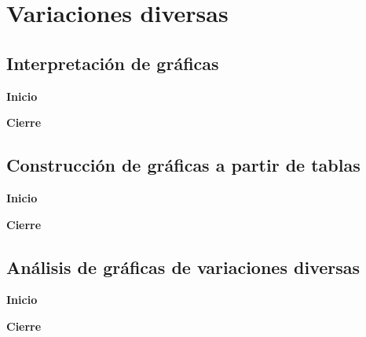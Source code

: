 \thispagestyle{plain}
\section{Variaciones diversas}


\subsection{Interpretación de gr\'aficas}

\begin{boxK}
    \begin{center}\textbf{Inicio}\end{center}

\end{boxK}

\begin{boxK}
    \begin{center}\textbf{Cierre}\end{center}

\end{boxK}

\subsection{Construcción de gr\'aficas a partir de tablas}

\begin{boxK}
    \begin{center}\textbf{Inicio}\end{center}

\end{boxK}

\begin{boxK}
    \begin{center}\textbf{Cierre}\end{center}

\end{boxK}

\subsection{Análisis de gr\'aficas de variaciones diversas}

\begin{boxK}
    \begin{center}\textbf{Inicio}\end{center}

\end{boxK}

\begin{boxK}
    \begin{center}\textbf{Cierre}\end{center}

\end{boxK}

\newpage